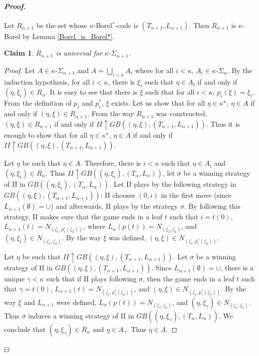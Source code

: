 \documentclass[12pt,a4paper]{amsart}
\newtheorem{claim}{Claim}[thm]
\theoremstyle{definition}
\theoremstyle{remark}
\newenvironment{cproof}{\paragraph{\emph{Proof.\,}}}{\hfill{$\boxminus$}\par\vspace{2mm}}
\def\borelstar{Borel\nobreak\hspace{1pt}$^*$}
\begin{document}
\begin{cproof}
    Let $R_{\alpha+1}$ be the set whose $\kappa$-\borelstar-code is $(T_{\alpha+1},L_{\alpha+1})$. Then $R_{\alpha+1}$ is $\kappa$-Borel by Lemma \ref{Borel_is_Borel*}.
    \begin{claim}
        $R_{\alpha+1}$ is universal for $\kappa\text{-}\Sigma_{\alpha+1}$.
    \end{claim}
    \begin{proof}
        Let $A\in \kappa\text{-}\Sigma_{\alpha+1}$ and $A=\bigcup_{i<\kappa}A_i$ where for all $i<\kappa$, $A_i\in \kappa\text{-}\Sigma_\alpha$. By the induction hypothesis, for all $i<\kappa$, there is $\xi_i$ such that $\eta\in A_i$ if and only if $(\eta,\xi_i)\in R_\alpha$. It is easy to see that there is $\xi$ such that for all $i<\kappa$, $p_i(\xi)=\xi_i$. From the definition of $p_i$ and $p^*_i$, $\xi$ exists. Let us show that for all $\eta\in \kappa^\kappa$, $\eta\in A$ if and only if $(\eta,\xi)\in R_{\alpha+1}$. From the way $R_{\alpha+1}$ was constructed, $(\eta,\xi)\in R_{\alpha+1}$ if and only if $II\uparrow GB((\eta,\xi),(T_{\alpha+1},L_{\alpha+1}))$. Thus it is enough to show that for all $\eta\in \kappa^\kappa$, $\eta\in A$ if and only if $II\uparrow GB((\eta,\xi),(T_{\alpha+1},L_{\alpha+1}))$.

        Let $\eta$ be such that $\eta\in A$. Therefore, there is $i<\kappa$ such that $\eta\in A_i$ and $(\eta,\xi_i)\in R_\alpha$. Thus $II\uparrow GB((\eta,\xi_i),(T_{\alpha},L_{\alpha}))$, let $\sigma$ be a winning strategy of II in $GB((\eta,\xi_i),(T_{\alpha},L_{\alpha}))$. Let II plays by the following strategy in $GB((\eta,\xi),(T_{\alpha+1},L_{\alpha+1}))$: II chooses $(0,i)$ in the first move (since $L_{\alpha+1}(\emptyset)=\cup$) and afterwards, II plays by the strategy $\sigma$. By following this strategy, II makes sure that the game ends in a leaf $t$ such that $i=t(0)$, $L_{\alpha+1}(t)=N_{(\zeta_1,p^*_i(\zeta_2))}$, where $L_\alpha(p(t))=N_{(\zeta_1,\zeta_2)}$, and $(\eta,\xi_i)\in N_{(\zeta_1,\zeta_2)}$. By the way $\xi$ was defined, $(\eta,\xi)\in N_{(\zeta_1,p^*_i(\zeta_2))}$.

        Let $\eta$ be such that $II\uparrow GB((\eta,\xi),(T_{\alpha+1},L_{\alpha+1}))$. Let $\sigma$ be a winning strategy of II in $GB((\eta,\xi),(T_{\alpha+1},L_{\alpha+1}))$. Since $L_{\alpha+1}(\emptyset)=\cup$, there is a unique $\gamma<\kappa$ such that if II plays following $\sigma$, then the game ends in a leaf $t$ such that $\gamma=t(0)$, $L_{\alpha+1}(t)=N_{(\zeta_1,p^*_\gamma(\zeta_2))}$, and $(\eta,\xi)\in N_{(\zeta_1,p^*_\gamma(\zeta_2))}$. By the way $\xi$ and $L_{\alpha+1}$ were defined, $L_\alpha(p(t))=N_{(\zeta_1,\zeta_2)}$, and $(\eta,\xi_\gamma)\in N_{(\zeta_1,\zeta_2)}$. Thus $\sigma$ induces a winning strategy of II in $GB((\eta,\xi_\gamma),(T_{\alpha},L_{\alpha}))$. We conclude that $(\eta,\xi_\gamma)\in R_\alpha$ and $\eta\in A_\gamma$. Thus $\eta\in A$.
    \end{proof}


\end{cproof}
\end{document}
